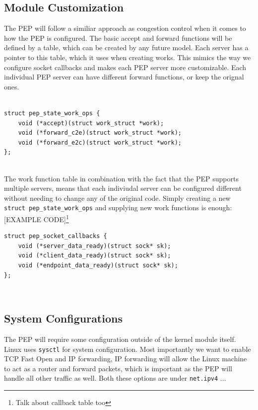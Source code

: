 \documentclass[a4paper,english, 11pt]{report}
\begin{document}
\subsection{Module Customization}
The PEP will follow a similiar approach as congestion control when it comes to how the PEP is configured. The basic accept and forward functions will be defined by a table, which can be created by any future model. Each server has a pointer to this table, which it uses when creating works. This mimics the way we configure socket callbacks and makes each PEP server more customizable. Each individual PEP server can have different forward functions, or keep the orignal ones.\\\\

\noindent\begin{minipage}{\linewidth}
\begin{verbatim}
struct pep_state_work_ops {
    void (*accept)(struct work_struct *work);
    void (*forward_c2e)(struct work_struct *work);
    void (*forward_e2c)(struct work_struct *work);
};
\end{verbatim}
\end{minipage}\\

The work function table in combination with the fact that the PEP supports multiple servers, means that each indiviudal server can be configured different without needing to change any of the original code. Simply creating a new \verb|struct pep_state_work_ops| and supplying new work functions is enough:\\

[EXAMPLE CODE]\footnote{Talk about callback table too}

\noindent\begin{minipage}{\linewidth}
\begin{verbatim}
struct pep_socket_callbacks {
    void (*server_data_ready)(struct sock* sk);
    void (*client_data_ready)(struct sock* sk);
    void (*endpoint_data_ready)(struct sock* sk);
};
\end{verbatim}
\end{minipage}\\

\subsection{System Configurations}
The PEP will require some configuration outside of the kernel module itself. Linux uses \verb|sysctl| for system configuration. Most importantly we want to enable TCP Fast Open and IP forwarding, IP forwarding will allow the Linux machine to act as a router and forward packets, which is important as the PEP will handle all other traffic as well. Both these options are under \verb|net.ipv4| ...\\
\end{document}
